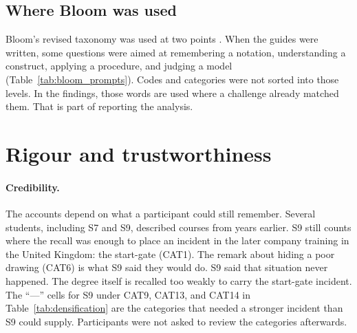 \subsection{Where Bloom was used}
\label{subsec:method_bloom_sensitising}

Bloom's revised taxonomy was used at two points \cite{krathwohl2002revision}. When the guides were written, some questions were aimed at remembering a notation, understanding a construct, applying a procedure, and judging a model (Table~\ref{tab:bloom_prompts}). Codes and categories were not sorted into those levels. In the findings, those words are used where a challenge already matched them. That is part of reporting the analysis.

\section{Rigour and trustworthiness}
\label{sec:method_rigour}

\paragraph{Credibility.}
The accounts depend on what a participant could still remember. Several students, including S7 and S9, described courses from years earlier. S9 still counts where the recall was enough to place an incident in the later company training in the United Kingdom: the start-gate (CAT1). The remark about hiding a poor drawing (CAT6) is what S9 said they would do. S9 said that situation never happened. The degree itself is recalled too weakly to carry the start-gate incident. The ``---'' cells for S9 under CAT9, CAT13, and CAT14 in Table~\ref{tab:densification} are the categories that needed a stronger incident than S9 could supply. Participants were not asked to review the categories afterwards.

